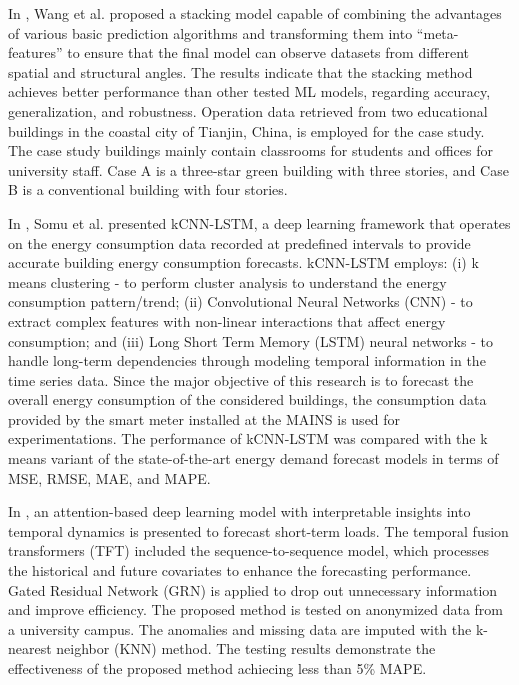 In \cite{WANG2020114561}, Wang et al. proposed a stacking model capable of combining the advantages of various basic prediction algorithms and transforming them into “meta-features” to ensure that the final model can observe datasets from different spatial and structural angles.
The results indicate that the stacking method achieves better performance than other tested ML models, regarding accuracy, generalization, and robustness.
Operation data retrieved from two educational buildings in the coastal city of Tianjin, China, is employed for the case study. The case study buildings mainly contain classrooms for students and offices for university staff. Case A is a three-star green building with three stories, and Case B is a conventional building with four stories.

In \cite{SOMU2021110591}, Somu et al. presented kCNN-LSTM, a deep learning framework that operates on the energy consumption data recorded at predefined intervals to provide accurate building energy consumption forecasts.
kCNN-LSTM employs:
(i) k means clustering - to perform cluster analysis to understand the energy consumption pattern\slash trend;
(ii) Convolutional Neural Networks (CNN) - to extract complex features with non-linear interactions that affect energy consumption;
and (iii) Long Short Term Memory (LSTM) neural networks - to handle long-term dependencies through modeling temporal information in the time series data.
Since the major objective of this research is to forecast the overall energy consumption of the considered buildings, the consumption data provided by the smart meter installed at the MAINS is used for experimentations.
The performance of kCNN-LSTM was compared with the k means variant of the state-of-the-art energy demand forecast models in terms of MSE, RMSE, MAE, and MAPE.

In \cite{10033079}, an attention-based deep learning model with interpretable insights into temporal dynamics is presented to forecast short-term loads.
The temporal fusion transformers (TFT) included the sequence-to-sequence model, which processes the historical and future covariates to enhance the forecasting performance.
Gated Residual Network (GRN) is applied to drop out unnecessary information and improve efficiency.
The proposed method is tested on anonymized data from a university campus.
The anomalies and missing data are imputed with the k-nearest neighbor (KNN) method.
The testing results demonstrate the effectiveness of the proposed method achiecing less than 5\% MAPE.

